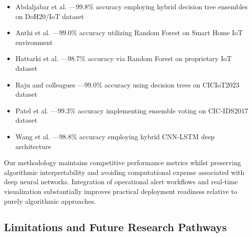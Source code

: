 \documentclass[conference]{IEEEtran}
\begin{document}
\begin{itemize}
\item Abdaljabar et al. \cite{b16}---99.8\% accuracy employing hybrid decision tree ensembles on DoH20/IoT dataset
\item Anthi et al. \cite{b20}---99.0\% accuracy utilizing Random Forest on Smart Home IoT environment
\item Hattarki et al. \cite{b17}---98.7\% accuracy via Random Forest on proprietary IoT dataset
\item Raju and colleagues \cite{b7}---99.0\% accuracy using decision trees on CICIoT2023 dataset
\item Patel et al. \cite{b10}---99.3\% accuracy implementing ensemble voting on CIC-IDS2017 dataset
\item Wang et al. \cite{b11}---98.8\% accuracy employing hybrid CNN-LSTM deep architecture
\end{itemize}

Our methodology maintains competitive performance metrics whilst preserving algorithmic interpretability \cite{b4} and avoiding computational expense associated with deep neural networks. Integration of operational alert workflows and real-time visualization \cite{b3} substantially improves practical deployment readiness relative to purely algorithmic approaches.

\subsection{Limitations and Future Research Pathways}
\end{document}
